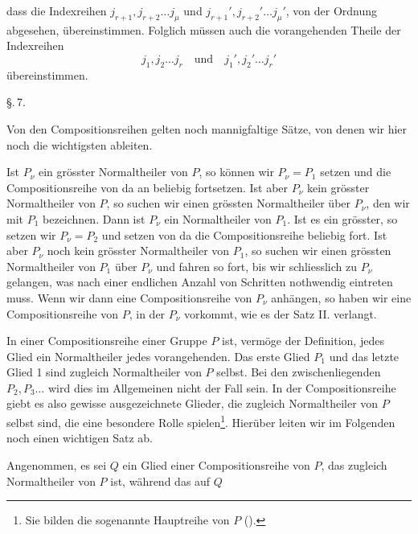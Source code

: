dass die Indexreihen $j_{r+1}, j_{r+2} \ldots j_\mu$ und $j_{r+1}',
j_{r+2}' \ldots j_\mu'$, von der Ordnung abgesehen, übereinstimmen.
Folglich müssen auch die vorangehenden Theile der Indexreihen
\[
j_1, j_2 \ldots j_r \quad \text{und} \quad j_1', j_2' \ldots j_r'
\]
übereinstimmen.

\begin{center}
\S.\,7.

\end{center}

Von den Compositionsreihen gelten noch mannigfaltige Sätze, von
denen wir hier noch die wichtigsten ableiten.


Ist $P_\nu$ ein grösster Normaltheiler von $P$, so können wir $P_\nu =
P_1$ setzen und die Compositionsreihe von da an beliebig
fortsetzen. Ist aber $P_\nu$ kein grösster Normaltheiler von $P$, so
suchen wir einen grössten Normaltheiler über $P_\nu$, den wir mit
$P_1$ bezeichnen. Dann ist $P_\nu$ ein Normaltheiler von $P_1$. Ist
es ein grösster, so setzen wir $P_\nu = P_2$ und setzen von da die
Compositionsreihe beliebig fort. Ist aber $P_\nu$ noch kein grösster
Normaltheiler von $P_1$, so suchen wir einen grössten
Normaltheiler von $P_1$ über $P_\nu$ und fahren so fort, bis wir
schliesslich zu $P_\nu$ gelangen, was nach einer endlichen Anzahl von
Schritten nothwendig eintreten muss. Wenn wir dann eine
Compositionsreihe von $P_\nu$ anhängen, so haben wir eine
Compositionsreihe von $P$, in der $P_\nu$ vorkommt, wie es der Satz
II. verlangt.

In einer Compositionsreihe einer Gruppe $P$ ist, vermöge der
Definition, jedes Glied ein Normaltheiler jedes vorangehenden. Das
erste Glied $P_1$ und das letzte Glied 1 sind zugleich
Normaltheiler von $P$ selbst. Bei den zwischenliegenden $P_2, P_3
\ldots$ wird dies im Allgemeinen nicht der Fall sein. In der
Compositionsreihe giebt es also gewisse ausgezeichnete Glieder, die
zugleich Normaltheiler von $P$ selbst sind, die eine besondere
Rolle spielen\footnote{Sie bilden die sogenannte Hauptreihe von $P$
().}. Hierüber leiten wir im Folgenden noch einen
wichtigen Satz ab.

Angenommen, es sei $Q$ ein Glied einer Compositionsreihe von $P$,
das zugleich Normaltheiler von $P$ ist, während das auf $Q$

